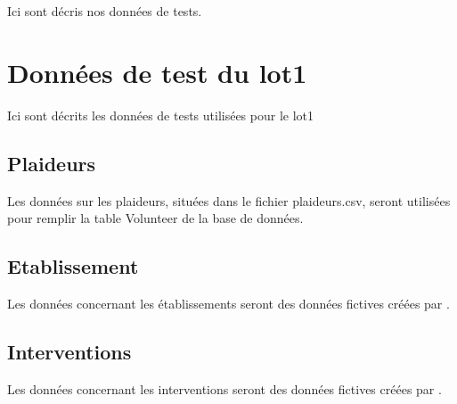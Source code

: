 

Ici sont décris nos données de tests.

\section{Données de test du lot1}
	Ici sont décrits les données de tests utilisées pour le lot1

\subsection{Plaideurs}
	Les données sur les plaideurs, situées dans le fichier plaideurs.csv, seront utilisées pour remplir la table Volunteer de la base de données. \\

\subsection{Etablissement}
	Les données concernant les établissements seront des données fictives créées par \nomEquipe.

\subsection{Interventions}
	Les données concernant les interventions seront des données fictives créées par \nomEquipe.

